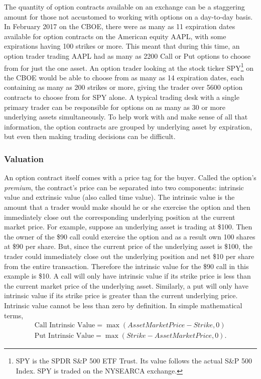 \documentclass[12pt, a4paper, notitlepage]{article}
\numberwithin{equation}{subsection}
\numberwithin{figure}{subsection}
\numberwithin{table}{subsection}
\newcommand{\newpar}{\newline \newline}
\begin{document}
The quantity of option contracts available on an exchange can be a staggering amount for those not accustomed to working with options on a day-to-day basis.  In February 2017 on the CBOE, there were as many as 11 expiration dates available for option contracts on the American equity AAPL, with some expirations having 100 strikes or more.  This meant that during this time, an option trader trading AAPL had as many as 2200 Call or Put options to choose from for just the one asset.  An option trader looking at the stock ticker SPY\footnote{SPY is the SPDR S\&P 500 ETF Trust.  Its value follows the actual S\&P 500 Index.  SPY is traded on the NYSEARCA exchange.} on the CBOE would be able to choose from as many as 14 expiration dates, each containing as many as 200 strikes or more, giving the trader over 5600 option contracts to choose from for SPY alone.  A typical trading desk with a single primary trader can be responsible for options on as many as 30 or more underlying assets simultaneously.  To help work with and make sense of all that information, the option contracts are grouped by underlying asset by expiration, but even then making trading decisions can be difficult.

\subsubsection{Valuation}
An option contract itself comes with a price tag for the buyer.  Called the option's \textit{premium}, the contract's price can be separated into two components: intrinsic value and extrinsic value (also called time value).
\newpar
The intrinsic value is the amount that a trader would make should he or she exercise the option and then immediately close out the corresponding underlying position at the current market price.  For example, suppose an underlying asset is trading at \$100.  Then the owner of the \$90 call could exercise the option and as a result own 100 shares at \$90 per share.  But, since the current price of the underlying asset is \$100, the trader could immediately close out the underlying position and net \$10 per share from the entire transaction.  Therefore the intrinsic value for the \$90 call in this example is \$10.
\newpar
A call will only have intrinsic value if its strike price is less than the current market price of the underlying asset.  Similarly, a put will only have intrinsic value if its strike price is greater than the current underlying price.  Intrinsic value cannot be less than zero by definition.  In simple mathematical terms,
\begin{equation*}
	\begin{split}
		\text{Call Intrinsic Value} = \max(AssetMarketPrice - Strike, 0) \\
    	\text{Put Intrinsic Value} = \max(Strike - AssetMarketPrice, 0).
	\end{split}
\end{equation*}
\end{document}
